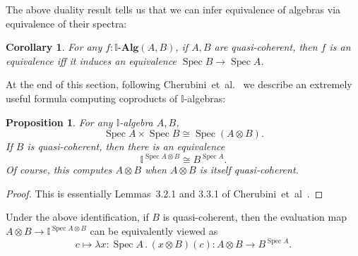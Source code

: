 \documentclass[12pt]{amsart}
\newtheorem{corollary}[theorem]{Corollary}
\newtheorem{proposition}[theorem]{Proposition}
\theoremstyle{definition}
\newcommand{\mb}[1]{\mathbf{#1}}
\newcommand{\mbb}[1]{\mathbb{#1}}
\newcommand{\I}{\mbb I}
\newcommand{\alg}{\text{-}\mb{Alg}}
\newcommand{\ld}[2]{\lambda #1\!\colon\!\!#2\mathpunct{.}}
\newcommand{\spec}{\operatorname{Spec}}
\begin{document}
The above duality result tells us that we can infer equivalence of algebras via equivalence of their spectra:

\begin{corollary}\label{cor:dualityeqv}
  For any $f : \I\alg(A,B)$, if $A,B$ are quasi-coherent, then $f$ is an equivalence iff it induces an equivalence $\spec B \to \spec A$. 
\end{corollary}

At the end of this section, following Cherubini~et~al.~\cite{Cherubini_Coquand_Hutzler_2024} we describe an extremely useful formula computing coproducts of $\I$-algebras:


\begin{proposition}\label{prop:tensorasspace}
  For any $\I$-algebra $A,B$, 
  \[ \spec A \times \spec B \cong \spec(A \otimes B). \]
  If $B$ is quasi-coherent, then there is an equivalence
  \[ \I^{\spec A \otimes B} \cong B^{\spec A}. \]
  Of course, this computes $A \otimes B$ when $A \otimes B$ is itself quasi-coherent.
\end{proposition}
\begin{proof}
  This is essentially Lemmas~3.2.1 and 3.3.1 of Cherubini~et~al~\cite{Cherubini_Coquand_Hutzler_2024}.
\end{proof}

Under the above identification, if $B$ is quasi-coherent, then the evaluation map $A \otimes B \to \I^{\spec A \otimes B}$ can be equivalently viewed as
\[ c \mapsto \ld{x}{\spec A} (x\otimes B)(c) : A \otimes B \to B^{\spec A}. \]

\end{document}
